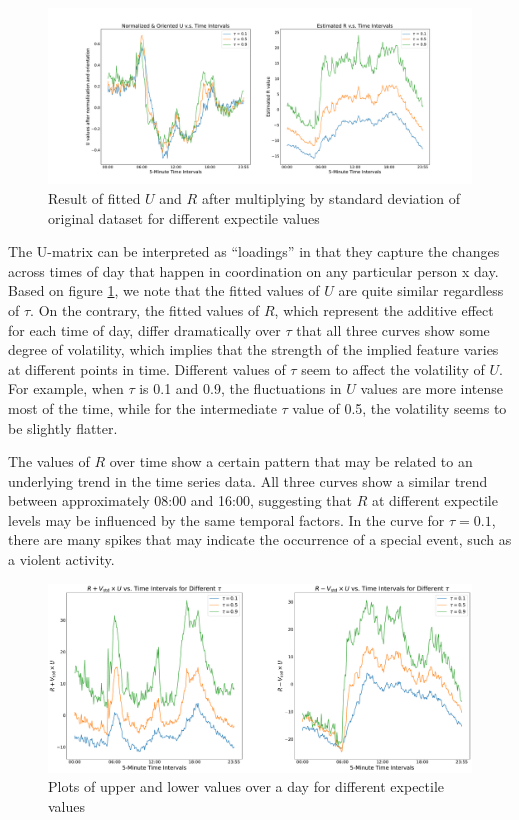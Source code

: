 \documentclass{article}
\begin{document}
\begin{figure}[ht]
\centering
\includegraphics[width=1\textwidth]{U_R.pdf} 
\caption{Result of fitted $U$ and $R$ after multiplying by standard deviation of original dataset for different expectile values} 
\label{U and R} 
\end{figure}

The U-matrix can be interpreted as ``loadings'' in that they capture the changes across times of day that happen in coordination on any particular person x day.  Based on figure \ref{U and R}, we note that the fitted values of $U$ are quite similar regardless of $\tau$.  On the contrary, the fitted values of $R$, which represent the additive effect for each time of day, differ dramatically over $\tau$ that all three curves show some degree of volatility, which implies that the strength of the implied feature varies at different points in time. Different values of $\tau$ seem to affect the volatility of $U$. For example, when $\tau$ is 0.1 and 0.9, the fluctuations in $U$ values are more intense most of the time, while for the intermediate $\tau$ value of 0.5, the volatility seems to be slightly flatter.

The values of $R$ over time show a certain pattern that may be related to an underlying trend in the time series data. All three curves show a similar trend between approximately 08:00 and 16:00, suggesting that $R$ at different expectile levels may be influenced by the same temporal factors. In the curve for $\tau = 0.1$, there are many spikes that may indicate the occurrence of a special event, such as a violent activity.

\begin{figure}[H]
\centering
\includegraphics[width=1\textwidth]{R+-V_U.pdf} 
\caption{Plots of upper and lower values over a day for different expectile values} 
\label{R+-V_U} 
\end{figure}
\end{document}
